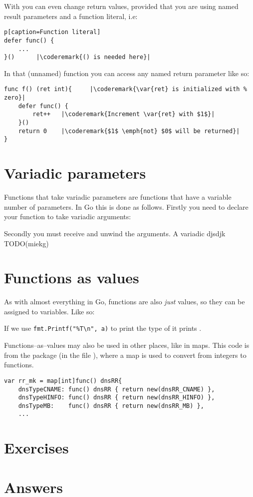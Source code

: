 With  you can even change return values, provided that
you are using named result parameters and a function literal, i.e:
\begin{lstlisting}p[caption=Function literal]
defer func() {
	...
}()		 |\coderemark{() is needed here}|
\end{lstlisting}
In that (unnamed) function you can access any named return
parameter like so:
\begin{lstlisting}[caption=Access return values within \func{defer}]
func f() (ret int){     |\coderemark{\var{ret} is initialized with %
zero}|
	defer func() {
		ret++	|\coderemark{Increment \var{ret} with $1$}|
	}()
	return 0	|\coderemark{$1$ \emph{not} $0$ will be returned}|
}
\end{lstlisting}


\section{Variadic parameters}
Functions that take variadic parameters are functions that have a
variable number of parameters. In Go this is done as follows.
Firstly you need to declare your function to take variadic arguments:

Secondly you must receive and unwind the arguments. A variadic
djsdjk TODO(miekg)

\section{Functions as values}
\label{sec:functions as values}
As with almost everything in Go, functions are also \emph{just} values,
so they can be assigned to variables. Like so:

If we use \lstinline{fmt.Printf("%T\n", a)} to print the type of  it prints
.

Functions--as--values may also be used in other places, like in maps.
This code is from the package  (in the file
), where a map is used to convert
from integers to functions.
\begin{lstlisting}[caption=Function as values in maps]
var rr_mk = map[int]func() dnsRR{
    dnsTypeCNAME: func() dnsRR { return new(dnsRR_CNAME) },
    dnsTypeHINFO: func() dnsRR { return new(dnsRR_HINFO) },
    dnsTypeMB:    func() dnsRR { return new(dnsRR_MB) },
    ...
\end{lstlisting}


\section{Exercises}










\cleardoublepage
\section{Answers}
\shipoutAnswer
